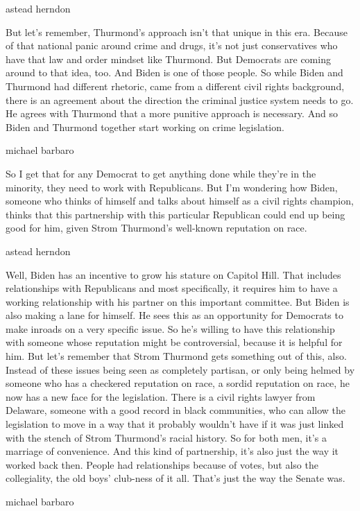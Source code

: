 astead herndon

But let's remember, Thurmond's approach isn't that unique in this era.
Because of that national panic around crime and drugs, it's not just
conservatives who have that law and order mindset like Thurmond. But
Democrats are coming around to that idea, too. And Biden is one of those
people. So while Biden and Thurmond had different rhetoric, came from a
different civil rights background, there is an agreement about the
direction the criminal justice system needs to go. He agrees with
Thurmond that a more punitive approach is necessary. And so Biden and
Thurmond together start working on crime legislation.

michael barbaro

So I get that for any Democrat to get anything done while they're in the
minority, they need to work with Republicans. But I'm wondering how
Biden, someone who thinks of himself and talks about himself as a civil
rights champion, thinks that this partnership with this particular
Republican could end up being good for him, given Strom Thurmond's
well-known reputation on race.

astead herndon

Well, Biden has an incentive to grow his stature on Capitol Hill. That
includes relationships with Republicans and most specifically, it
requires him to have a working relationship with his partner on this
important committee. But Biden is also making a lane for himself. He
sees this as an opportunity for Democrats to make inroads on a very
specific issue. So he's willing to have this relationship with someone
whose reputation might be controversial, because it is helpful for him.
But let's remember that Strom Thurmond gets something out of this, also.
Instead of these issues being seen as completely partisan, or only being
helmed by someone who has a checkered reputation on race, a sordid
reputation on race, he now has a new face for the legislation. There is
a civil rights lawyer from Delaware, someone with a good record in black
communities, who can allow the legislation to move in a way that it
probably wouldn't have if it was just linked with the stench of Strom
Thurmond's racial history. So for both men, it's a marriage of
convenience. And this kind of partnership, it's also just the way it
worked back then. People had relationships because of votes, but also
the collegiality, the old boys' club-ness of it all. That's just the way
the Senate was.

michael barbaro

